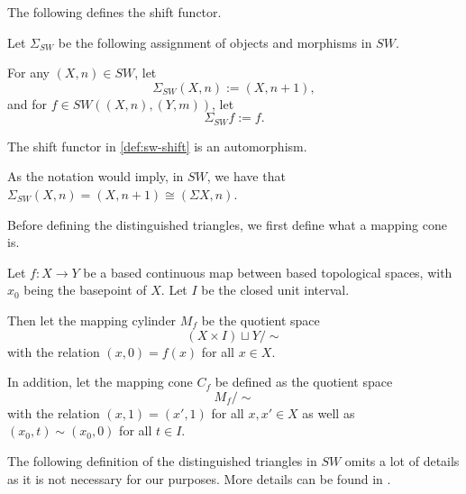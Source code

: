 The following defines the shift functor.
\begin{definition}
    \label{def:sw-shift}
    Let \( \Sigma_{SW} \) be the following assignment of objects and morphisms in \( SW \).

    For any \( (X, n) \in SW \), let
    \[
        \Sigma_{SW} (X, n) := (X, n + 1),
    \] 
    and for \( f \in SW((X, n), (Y, m)) \), let
    \[
        \Sigma_{SW} f := f.
    \]
\end{definition}

The shift functor in \autoref{def:sw-shift} is an automorphism.

As the notation would imply, in \( SW \), we have that \( \Sigma_{SW} (X, n) = (X, n + 1) \cong ( \Sigma X, n ) \).

Before defining the distinguished triangles, we first define what a mapping cone is.
\begin{definition}
    Let \( f: X \to Y \) be a based continuous map between based topological spaces, with \( x_0 \) being the basepoint of \( X \). Let \( I \) be the closed unit interval.

    Then let the mapping cylinder \( M_f \) be the quotient space
    \[
        (X \times I) \sqcup Y / \sim
    \]
    with the relation \( (x, 0) = f(x) \) for all \( x \in X \).

    In addition, let the mapping cone \( C_f \) be defined as the quotient space
    \[
        M_f / \sim
    \]
    with the relation \( (x, 1) = (x', 1) \) for all \( x, x' \in X \) as well as \( (x_0, t) \sim (x_0, 0) \) for all \( t \in I \).
\end{definition}

The following definition of the distinguished triangles in \( SW \) omits a lot of details as it is not necessary for our purposes. More details can be found in \cite[Definition 5.8, and Definition 4.7]{Daria_Bachelor}.

